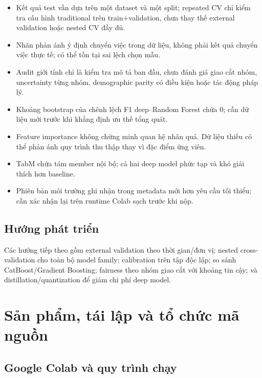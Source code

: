 \documentclass[12pt,a4paper,oneside]{report}
\begin{document}
\begin{itemize}
  \item Kết quả test vẫn dựa trên một dataset và một split; repeated CV chỉ kiểm tra cấu hình traditional trên train+validation, chưa thay thế external validation hoặc nested CV đầy đủ.
  \item Nhãn phản ánh ý định chuyển việc trong dữ liệu, không phải kết quả chuyển việc thực tế; có thể tồn tại sai lệch chọn mẫu.
  \item Audit giới tính chỉ là kiểm tra mô tả ban đầu, chưa đánh giá giao cắt nhóm, uncertainty từng nhóm, demographic parity có điều kiện hoặc tác động pháp lý.
  \item Khoảng bootstrap của chênh lệch F1 deep--Random Forest chứa 0; cần dữ liệu mới trước khi khẳng định ưu thế tổng quát.
  \item Feature importance không chứng minh quan hệ nhân quả. Dữ liệu thiếu có thể phản ánh quy trình thu thập thay vì đặc điểm ứng viên.
  \item TabM chứa tám member nội bộ; cả hai deep model phức tạp và khó giải thích hơn baseline.
  \item Phiên bản môi trường ghi nhận trong metadata mới hơn yêu cầu tối thiểu; cần xác nhận lại trên runtime Colab sạch trước khi nộp.
\end{itemize}

\section{Hướng phát triển}

Các hướng tiếp theo gồm external validation theo thời gian/đơn vị; nested cross-validation cho toàn bộ model family; calibration trên tập độc lập; so sánh CatBoost/Gradient Boosting; fairness theo nhóm giao cắt với khoảng tin cậy; và distillation/quantization để giảm chi phí deep model.

\chapter{Sản phẩm, tái lập và tổ chức mã nguồn}

\section{Google Colab và quy trình chạy}
\end{document}
